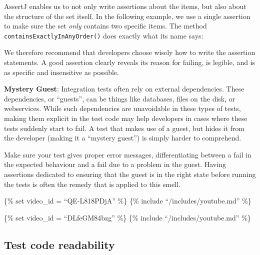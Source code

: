 AssertJ enables us to not only write assertions about the items, but
also about the structure of the set itself. In the following example, we
use a single assertion to make sure the set \emph{only} contains two
specific items. The method \texttt{containsExactlyInAnyOrder()} does
exactly what its name says:

\begin{Shaded}
\begin{Highlighting}[]
 \NormalTok{() \{}
\NormalTok{(}\NormalTok{);}
\NormalTok{(}\NormalTok{);}

\NormalTok{();}

    \NormalTok{(}\NormalTok{, }\NormalTok{);}
\NormalTok{\}}
\end{Highlighting}
\end{Shaded}

We therefore recommend that developers choose wisely how to write the
assertion statements. A good assertion clearly reveals its reason for
failing, is legible, and is as specific and insensitive as possible.

\textbf{Mystery Guest}: Integration tests often rely on external
dependencies. These dependencies, or ``guests'', can be things like
databases, files on the disk, or webservices. While such dependencies
are unavoidable in these types of tests, making them explicit in the
test code may help developers in cases where these tests suddenly start
to fail. A test that makes use of a guest, but hides it from the
developer (making it a ``mystery guest'') is simply harder to
comprehend.

Make sure your test gives proper error messages, differentiating between
a fail in the expected behaviour and a fail due to a problem in the
guest. Having assertions dedicated to ensuring that the guest is in the
right state before running the tests is often the remedy that is applied
to this smell.

\{\% set video\_id = ``QE-L818PDjA'' \%\} \{\% include
``/includes/youtube.md'' \%\}

\{\% set video\_id = ``DLfeGM84bzg'' \%\} \{\% include
``/includes/youtube.md'' \%\}

\hypertarget{test-code-readability}{%
\subsection{Test code readability}\label{test-code-readability}}

